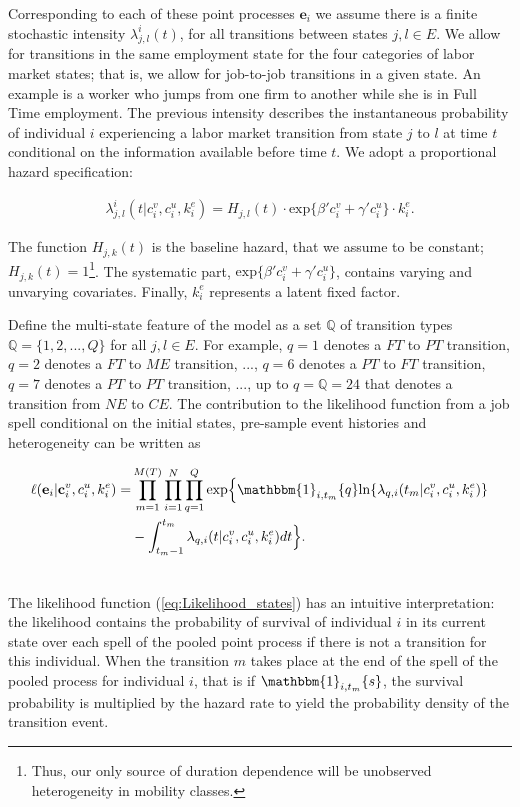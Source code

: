 \documentclass[12pt, a4paper]{article}
\begin{document}
Corresponding to each of these point processes $\textbf{e}_i$ we assume there is a finite stochastic intensity $\lambda_{j,l}^{i}(t)$, for all transitions between states $j,l \in E$. We allow for transitions in the same employment state for the four categories of labor market states; that is, we allow for job-to-job transitions in a given state. An example is a worker who jumps from one firm to another while she is in Full Time employment. The previous intensity describes the instantaneous probability of individual $i$ experiencing a labor market transition from state $j$ to $l$ at time $t$ conditional on the information available before time $t$. We adopt a proportional hazard specification:

\begin{align}
\lambda_{j,l}^{i}(t|c_i^v,c_i^u,k_i^e) = H_{j,l}(t)\cdot\text{exp}\{\beta' c_i^{v} + \gamma' c_i^u\}\cdot k_i^{e}.
\end{align} 

The function $H_{j,k}(t)$ is the baseline hazard, that we assume to be constant; $H_{j,k}(t)=1$\footnote{Thus, our only source of duration dependence will be unobserved heterogeneity in mobility classes.}. The systematic part, $\text{exp}\{\beta' c_i^{v} + \gamma' c_i^u\}$, contains varying and unvarying covariates. Finally, $k_i^{e}$ represents a latent fixed factor.

Define the multi-state feature of the model as a set $\mathbb{Q}$ of transition types $\mathbb{Q} = \{1,2,...,Q\}$ for all $j,l \in E$. For example, $q = 1$ denotes a $FT$ to $PT$ transition, $q = 2$ denotes a $FT$ to $ME$ transition, ..., $q = 6$ denotes a $PT$ to $FT$ transition, $q = 7$ denotes a $PT$ to $PT$ transition, ..., up to $q = \mathbb{Q} = 24$ that denotes a transition from $NE$ to $CE$.  The contribution to the likelihood function from a job spell conditional on the initial states, pre-sample event histories and heterogeneity can be written as

\begin{align}\label{eq:Likelihood_states}
\ell(\textbf{e}_i|\textbf{c}_i^v,c_i^u,k_i^e)  = & \prod_{m=1}^{M(T)} \prod_{i=1}^{N} \prod_{q=1}^{Q} \text{exp}\Big\{\mathbbm{1}_{i,t_m}\{q\} \text{ln}\{\lambda_{q,i}(t_m|c_i^v,c_i^u,k_i^e)\} \\ \nonumber
& - \int_{t_m-1}^{t_m}\lambda_{q,i}(t|c_i^v,c_i^u,k_i^e)dt \Big\}.\\ \nonumber
\end{align}

The likelihood function (\ref{eq:Likelihood_states}) has an intuitive interpretation: the likelihood contains the probability of survival of individual $i$ in its current state over each spell of the pooled point process if there is not a transition for this individual. When the transition $m$ takes place at the end of the spell of the pooled process for individual $i$, that is if $\mathbbm{1}_{i,t_m}\{s\}$, the survival probability is multiplied by the hazard rate to yield the probability density of the transition event.
\end{document}
